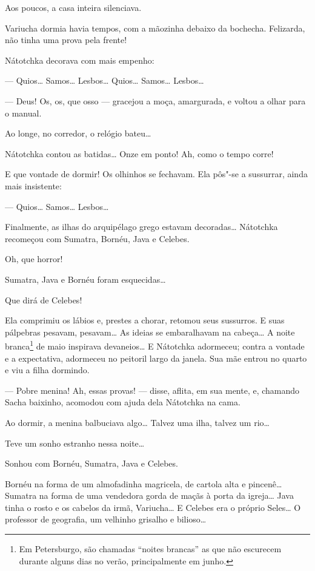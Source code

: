 Aos poucos, a casa inteira silenciava.

Variucha dormia havia tempos, com a mãozinha debaixo da bochecha.
Felizarda, não tinha uma prova pela frente!

Nátotchka decorava com mais empenho:

--- Quios\ldots{} Samos\ldots{} Lesbos\ldots{} Quios\ldots{} Samos\ldots{} Lesbos\ldots{}

--- Deus! Os, os, que osso --- gracejou a moça,
amargurada, e voltou a olhar para o manual.

Ao longe, no corredor, o relógio bateu\ldots{}

Nátotchka contou as batidas\ldots{} Onze em ponto! Ah, como o tempo corre!

E que vontade de dormir! Os olhinhos se fechavam. Ela pôs"-se a
sussurrar, ainda mais insistente:

--- Quios\ldots{} Samos\ldots{} Lesbos\ldots{}

Finalmente, as ilhas do arquipélago grego estavam decoradas\ldots{} Nátotchka
recomeçou com Sumatra, Bornéu, Java e Celebes.

Oh, que horror!

Sumatra, Java e Bornéu foram esquecidas\ldots{}

Que dirá de Celebes!

Ela comprimiu os lábios e, prestes a chorar, retomou seus
sussurros. E suas pálpebras pesavam, pesavam\ldots{} As ideias se
embaralhavam na cabeça\ldots{} A noite branca\footnote{Em Petersburgo, são
  chamadas ``noites brancas'' as que não escurecem durante alguns dias no verão, principalmente em junho.} de maio inspirava devaneios\ldots{} E
Nátotchka adormeceu; contra a vontade e a expectativa, adormeceu no
peitoril largo da janela. Sua mãe entrou no quarto e viu a filha
dormindo.

--- Pobre menina! Ah, essas provas! --- disse, aflita, em sua mente, e,
chamando Sacha baixinho, acomodou com ajuda dela Nátotchka na cama.

Ao dormir, a menina balbuciava algo\ldots{} Talvez uma ilha, talvez um rio\ldots{}

Teve um sonho estranho nessa noite\ldots{}

Sonhou com Bornéu, Sumatra, Java e Celebes.

Bornéu na forma de um almofadinha magricela, de cartola alta e
pincenê\ldots{} Sumatra na forma de uma vendedora gorda de maçãs à porta da
igreja\ldots{} Java tinha o rosto e os cabelos da irmã, Variucha\ldots{} E Celebes
era o próprio Seles\ldots{} O professor de geografia, um velhinho grisalho e
bilioso\ldots{}

